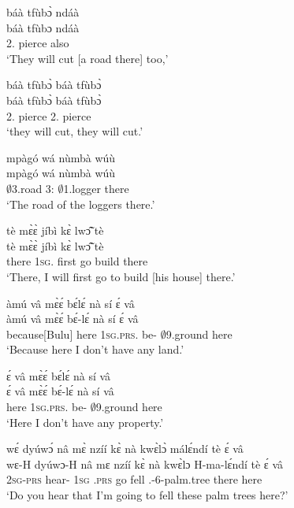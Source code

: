 \begin{exe}[(C234)]
\exC\label{71} 
  \glll   báà tfùbɔ̀ ndáà \\
        báà tfùbɔ ndáà \\
           2.{\FUT} pierce also  \\
    \trans `They will cut [a road there] too,'
 
\exC\label{72} 
  \glll   báà tfùbɔ̀ báà tfùbɔ̀ \\
           báà tfùbɔ̀ báà tfùbɔ̀ \\
           2.{\FUT} pierce 2.{\FUT} pierce  \\
    \trans `they will cut, they will cut.'
 
\exC\label{73}
  \glll  mpàgó wá nùmbà wúù \\
           mpàgó wá nùmbà wúù \\
          $\emptyset$3.road 3:{\ATT}  $\emptyset$1.logger there   \\
    \trans `The road of the loggers there.'
 
\exC\label{74}
  \glll   tè mɛ̀ɛ̀ jíbì kɛ̀ lwɔ̃̂ tè \\
          tè mɛ̀ɛ̀ jíbì kɛ̀ lwɔ̃̂ tè \\
           there 1\textsc{sg}.{\FUT} first go build there  \\
    \trans `There, I will first go to build [his house] there.'
 
\exC\label{75}
  \glll  àmú vâ mɛ̀ɛ́ bɛ́lɛ́ nà sí ɛ́ vâ \\
         àmú vâ mɛ̀ɛ́ bɛ́-lɛ́ nà sí ɛ́ vâ \\
           because[Bulu] here 1\textsc{sg}.\textsc{prs}.{\NEG} be-{\NEG} {\COM} $\emptyset$9.ground {\LOC} here  \\
    \trans `Because here I don't have any land.'
 
\exC\label{76} 
  \glll  ɛ́ vâ mɛ̀ɛ́ bɛ́lɛ́ nà sí vâ \\
         ɛ́ vâ mɛ̀ɛ́ bɛ́-lɛ́ nà sí vâ \\
          {\LOC}  here 1\textsc{sg}.\textsc{prs}.{\NEG} be-{\NEG} {\COM} $\emptyset$9.ground here  \\
    \trans `Here I don't have any property.'
 
\exC\label{77}
  \glll  wɛ́ dyúwɔ́ nâ mɛ̀ nzíí kɛ̀ nà kwɛ̀lɔ̀ málɛ́ndí tè ɛ́ vâ \\
         wɛ-H dyúwɔ-H nâ mɛ nzíí kɛ̀ nà kwɛ̀lɔ H-ma-lɛ́ndí tè ɛ́ vâ \\
           2\textsc{sg}-\textsc{prs} hear-{\R} {\COMP} 1\textsc{sg} {\PROG}.\textsc{prs} go {\CONJ} fell {\OBJ}.{\LINK}-6-palm.tree there {\LOC} here \\
    \trans `Do you hear that I'm going to fell these palm trees here?'
 

\end{exe}
